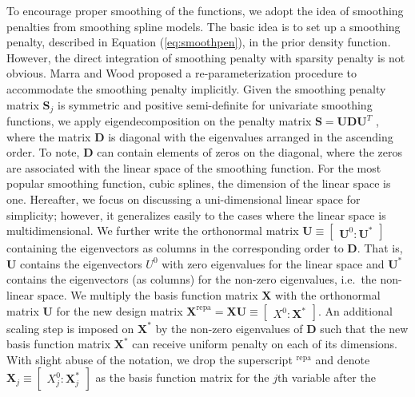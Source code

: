 \documentclass[AMA,STIX1COL,]{WileyNJD-v2}
\begin{document}
To encourage proper smoothing of the functions, we adopt the idea of
smoothing penalties from smoothing spline models. The basic idea is to
set up a smoothing penalty, described in Equation (\ref{eq:smoothpen}),
in the prior density function. However, the direct integration of
smoothing penalty with sparsity penalty is not obvious. Marra and Wood
\citep{Marra2011} proposed a re-parameterization procedure to
accommodate the smoothing penalty implicitly. Given the smoothing
penalty matrix \(\boldsymbol{S}_j\) is symmetric and positive
semi-definite for univariate smoothing functions, we apply
eigendecomposition on the penalty matrix
\(\boldsymbol{S} = \boldsymbol{U} \boldsymbol{D} \boldsymbol{U}^T\) ,
where the matrix \(\boldsymbol{D}\) is diagonal with the eigenvalues
arranged in the ascending order. To note, \(\boldsymbol{D}\) can contain
elements of zeros on the diagonal, where the zeros are associated with
the linear space of the smoothing function. For the most popular
smoothing function, cubic splines, the dimension of the linear space is
one. Hereafter, we focus on discussing a uni-dimensional linear space
for simplicity; however, it generalizes easily to the cases where the
linear space is multidimensional. We further write the orthonormal
matrix
\(\boldsymbol{U} \equiv \begin{bmatrix} \boldsymbol{U}^0 : \boldsymbol{U}^{*}\end{bmatrix}\)
containing the eigenvectors as columns in the corresponding order to
\(\boldsymbol{D}\). That is, \(\boldsymbol{U}\) contains the
eigenvectors \(U^0\) with zero eigenvalues for the linear space and
\(\boldsymbol{U}^{*}\) contains the eigenvectors (as columns) for the
non-zero eigenvalues, i.e.~the non-linear space. We multiply the basis
function matrix \(\boldsymbol{X}\) with the orthonormal matrix
\(\boldsymbol{U}\) for the new design matrix
\({\boldsymbol{X}}^\text{repa}= \boldsymbol{X} \boldsymbol{U} \equiv \begin{bmatrix} X^0 : \boldsymbol{X}^{*} \end{bmatrix}\).
An additional scaling step is imposed on \(\boldsymbol{X}^{*}\) by the
non-zero eigenvalues of \(\boldsymbol{D}\) such that the new basis
function matrix \(\boldsymbol{X}^\ast\) can receive uniform penalty on
each of its dimensions. With slight abuse of the notation, we drop the
superscript \(^\text{repa}\) and denote
\(\boldsymbol{X}_j \equiv \begin{bmatrix} X_j^0 : \boldsymbol{X}_j^{*} \end{bmatrix}\)
as the basis function matrix for the \(j\)th variable after the
\end{document}
